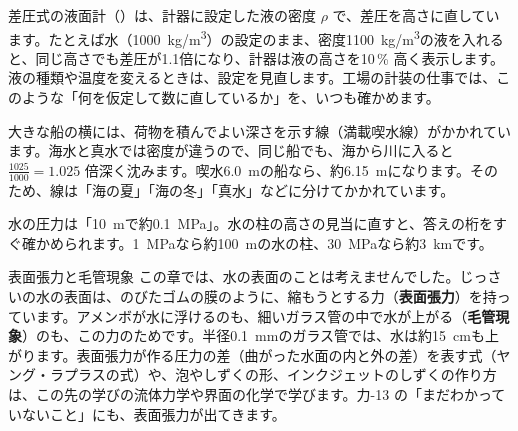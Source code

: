 \begin{phkougaku}
差圧式の液面計（\nobreak{}\nobreak）は、計器に設定した液の密度 $\rho$ で、差圧を高さに直しています。たとえば水（\qty{1000}{kg/m^3}）の設定のまま、密度\qty{1100}{kg/m^3}の液を入れると、同じ高さでも差圧が1.1倍になり、計器は液の高さを10\,\% 高く表示します。液の種類や温度を変えるときは、設定を見直します。工場の計装の仕事では、このような「何を仮定して数に直しているか」を、いつも確かめます。

大きな船の横には、荷物を積んでよい深さを示す線（満載喫水線）がかかれています。海水と真水では密度が違うので、同じ船でも、海から川に入ると $\tfrac{1025}{1000}=1.025$ 倍深く沈みます。喫水\qty{6.0}{m}の船なら、約\qty{6.15}{m}になります。そのため、線は「海の夏」「海の冬」「真水」などに分けてかかれています。

\begin{phketa}[流体の圧力と密度]
水の圧力は「\qty{10}{m}で約\qty{0.1}{MPa}」。水の柱の高さの見当に直すと、答えの桁をすぐ確かめられます。\qty{1}{MPa}なら約\qty{100}{m}の水の柱、\qty{30}{MPa}なら約\qty{3}{km}です。
\end{phketa}
\end{phkougaku}

\begin{phsaki}{表面張力と毛管現象}
この章では、水の表面のことは考えませんでした。じっさいの水の表面は、のびたゴムの膜のように、縮もうとする力（\textbf{表面張力}）を持っています。アメンボが水に浮けるのも、細いガラス管の中で水が上がる（\textbf{毛管現象}）のも、この力のためです。半径\qty{0.1}{mm}のガラス管では、水は約\qty{15}{cm}も上がります。表面張力が作る圧力の差（曲がった水面の内と外の差）を表す式（ヤング・ラプラスの式）や、泡やしずくの形、インクジェットのしずくの作り方は、この先の学びの流体力学や界面の化学で学びます。力-13 の「まだわかっていないこと」にも、表面張力が出てきます。
\end{phsaki}

